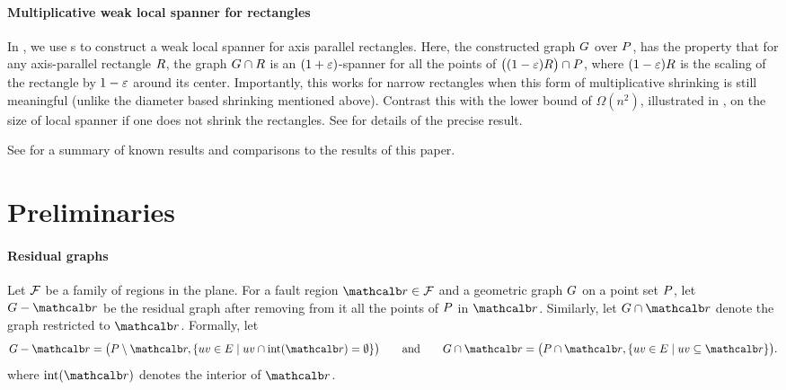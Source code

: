 \documentclass[12pt]{article}%
\begin{document}
\paragraph{Multiplicative weak local spanner for rectangles}

In , we use \QSPD{}s to construct a weak local
spanner for axis parallel rectangles.  Here, the constructed graph
$G$ over $P$, has the property that for any axis-parallel rectangle
$R$, the graph $G \cap {R}$ is an $(1+\varepsilon)$-spanner
for all the points of $\bigl((1-\varepsilon)R \bigr)\cap P$, where
$(1-\varepsilon)R$ is the scaling of the rectangle by $1-\varepsilon$ around its
center. Importantly, this works for narrow rectangles when this form
of multiplicative shrinking is still meaningful (unlike the diameter
based shrinking mentioned above). Contrast this with the lower bound
of $\Omega(n^2)$, illustrated in , on the size
of local spanner if one does not shrink the rectangles. See
 for details of the precise result.

\bigskip

See  for a summary of known results and
comparisons to the results of this paper.








\section{Preliminaries}


\paragraph{Residual graphs}

Let $\mathcal{F}$ be a family of regions in the plane. For a fault region
$\region \in \FF$ and a geometric graph $G$ on a point set $P$, let
$\G \gminus \region$ be the residual graph after removing from it all
the points of $P$ in $\region$. Similarly, let
$\restrictY{\G}{\region}$ denote the graph restricted to $\region$.
Formally, let
\begin{equation*}
    \G \gminus \region%
    =%
    \bigl( \PS \setminus \region, \Set{ uv \in \EG }{ uv \cap
       \interiorX{\region} = \emptyset} \bigr)
    \qquad\text{and}\qquad%
    \restrictY{\G}{\region}%
    =%
    \bigl( \PS \cap {\region},
    \Set{uv \in \EG}{ uv \subseteq {\region} } \bigr).
\end{equation*}
where $\interiorX{\region}$ denotes the interior of $\region$.
\end{document}
